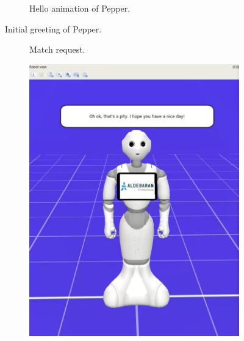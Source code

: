 \documentclass{article}
\begin{document}
\begin{figure}[H]
\begin{subfigure}{.5\textwidth}
      \caption{Hello animation of Pepper.}
    \end{subfigure}
    \caption{Initial greeting of Pepper.}
    \label{fig:initial}
\end{figure}

\begin{figure}[H]
    \centering
    \begin{subfigure}{.33\textwidth}
      \centering
      \caption{Match request.}
    \end{subfigure}%
    \begin{subfigure}{.33\textwidth}
      \centering
      \includegraphics[width=0.9\linewidth]{images/21_non voglio giocare.png}

\end{subfigure}
\end{figure}
\end{document}
